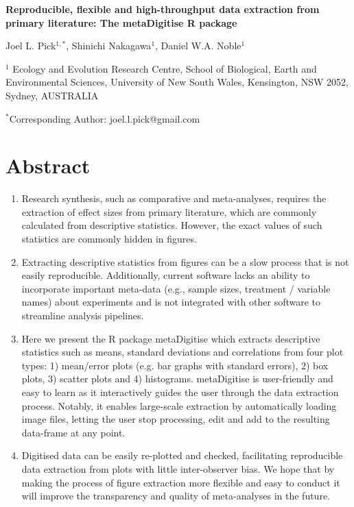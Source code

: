 \documentclass[12pt]{article}
\newcommand{\pkg}[1]{{\fontseries{b}\selectfont #1}}
\let\proglang=\textsf
\begin{document}
\newenvironment{CodeChunk}{}{}

\raggedright


\textbf{Reproducible, flexible and high-throughput data extraction from primary literature: The \pkg{metaDigitise} \proglang{R} package}

Joel L. Pick$^{1,*}$, Shinichi Nakagawa$^1$, Daniel W.A. Noble$^1$

$^1$
  Ecology and Evolution Research Centre, School of Biological, Earth and Environmental Sciences,  University of New South Wales, Kensington, NSW 2052, Sydney, AUSTRALIA

 $^*$Corresponding Author: joel.l.pick@gmail.com\\


\clearpage
\section*{Abstract}
\begin{enumerate} 
\item Research synthesis, such as comparative and meta-analyses, requires the extraction of effect sizes from primary literature, which are commonly calculated from descriptive statistics. However, the exact values of such statistics are commonly hidden in figures. 

\item Extracting descriptive statistics from figures can be a slow process that is not easily reproducible. Additionally, current software lacks an ability to incorporate important meta-data (e.g., sample sizes, treatment / variable names) about experiments and is not integrated with other software to streamline analysis pipelines.

\item Here we present the R package \pkg{metaDigitise} which extracts descriptive statistics such as means, standard deviations and correlations from four plot types: 1) mean/error plots (e.g. bar graphs with standard errors), 2) box plots, 3) scatter plots and 4) histograms. \pkg{metaDigitise} is user-friendly and easy to learn as it interactively guides the user through the data extraction process. Notably, it enables large-scale extraction by automatically loading image files, letting the user stop processing, edit and add to the resulting data-frame at any point. 

\item Digitised data can be easily re-plotted and checked, facilitating reproducible data extraction from plots with little inter-observer bias. We hope that by making the process of figure extraction more flexible and easy to conduct it will improve the transparency and quality of meta-analyses in the future.
\end{enumerate}
\end{document}
